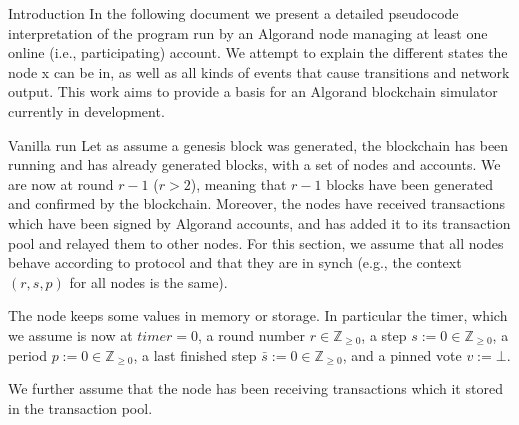 \documentclass[10pt,a4paper]{article}
\begin{document}
\begin{section}{Introduction}
In the following document we present a detailed pseudocode interpretation 
of the program run by an Algorand node managing at least one online (i.e., 
participating) account. We attempt to explain the different states the node x
can be in, as well as all kinds of events that cause transitions and network 
output. This work aims to provide a basis for an Algorand blockchain simulator 
currently in development. 

\begin{subsection}{Vanilla run}\label{subsect:vanilla-run}
Let as assume a genesis block was generated, the blockchain has been running and
has already generated blocks, with a set of nodes and accounts. 
We are now at round $r-1$ ($r>2$), meaning
that $r-1$ blocks have been generated and confirmed by the blockchain.
Moreover, the nodes have received transactions which have been signed 
by Algorand accounts, and has added it to its transaction pool and 
relayed them to other nodes.
For this section, we assume that all nodes behave according to protocol
and that they are in synch (e.g., the context $(r,s,p)$ for all nodes is 
the same).

The node keeps some values in memory or storage. In particular the 
timer, which we assume is now at $timer=0$,
a round number $r\in\mathbb{Z}_{\ge 0}$, 
a step $s:=0\in\mathbb{Z}_{\ge 0}$,
a period $p:=0\in\mathbb{Z}_{\ge 0}$, 
a last finished step $\bar{s}:=0\in\mathbb{Z}_{\ge 0}$, and 
a pinned vote $v:=\bot$.

We further assume that the node
has been receiving transactions which it stored in the transaction pool. 


\end{subsection}
\end{section}
\end{document}
